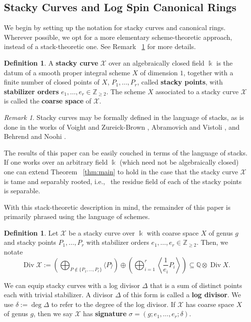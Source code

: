 \documentclass{amsart}
\theoremstyle{plain}
\theoremstyle{definition}
\newtheorem{defn}[thm]{Definition}
\theoremstyle{remark}
\newtheorem{rem}[thm]{Remark}
\numberwithin{equation}{section}
\newcommand\ssec{\subsection}
\newcommand\BQ{{\mathbb Q}}
\newcommand\BZ{{\mathbb Z}}
\newcommand\Bk{{\Bbbk}}
\DeclareMathOperator\di{Div}
\newcommand\sx{\mathscr X}
\begin{document}
\ssec{Stacky Curves and Log Spin Canonical Rings}
\label{ssec:stacky-background}
We begin by setting up the notation for stacky curves and canonical rings. Wherever possible, we opt for a more elementary scheme-theoretic approach, instead of a stack-theoretic one. See Remark ~\ref{rem:stack-formalism} for more details.

\begin{defn}
\label{defn:stacky-curve}
A \textbf{stacky curve} $\sx$ over an algebraically closed field $\Bk$ is the datum of a smooth proper integral scheme $X$ of dimension $1$, together with a finite number of closed points of $X$, $P_1, \ldots, P_r$, called {\bf stacky points}, with {\bf stabilizer orders} $e_1, \ldots, e_r \in \BZ_{\geq 2}.$ The scheme $X$ associated to a stacky curve $\sx$ is called the {\bf coarse space} of $\sx$.
\end{defn}

\begin{rem}
\label{rem:stack-formalism}
Stacky curves may be formally defined in the language of stacks, as
is done in the works of Voight and Zureick-Brown \cite{vzb:stacky},
Abramovich and Vistoli \cite{abramovich-vistoli:compactifying}, and
Behrend and Noohi \cite{behrend-noohi:uniformization}.

The results of this paper can be easily couched in terms of the language of stacks. If one works over an arbitrary field $\Bk$ (which need not be algebraically closed) one can extend Theorem ~\ref{thm:main} to hold in the case that the stacky curve $\sx$ is tame and separably rooted, i.e.,~ the residue field of each
of the stacky points is separable.

With this stack-theoretic description in mind, the remainder of this paper is primarily phrased using the language
of schemes.
\end{rem}

\begin{defn}
\label{defn:div-ex}
Let $\sx$ be a stacky curve over $\Bk$ with coarse space $X$ of genus $g$ and stacky points $P_1, \ldots,
P_r$ with stabilizer orders $e_1, \ldots, e_r \in \BZ_{\geq 2}$.
Then, we notate
\[
	\di \sx := \left(\bigoplus_{P\notin \{P_1, \ldots, P_r\}} \langle 
	P \rangle \right) \oplus \left(\bigoplus_{i = 1}^r \left \langle 
	\frac{1}{e_i}P_i \right \rangle \right) \subseteq \BQ \otimes \di X.
\]
\end{defn}

We can equip stacky curves with a log divisor $\Delta$ that is a 
sum of distinct points each with trivial stabilizer. 
A divisor
$\Delta$ of this form is called a \textbf{log divisor}. We use
$\delta := \deg \Delta$ to refer to the degree of the log divisor.
If $\sx$ has coarse space $X$ of genus $g$, then we say $\sx$ has
\textbf{signature} $\sigma = (g; e_1, \ldots, e_r; \delta)$.
\end{document}
